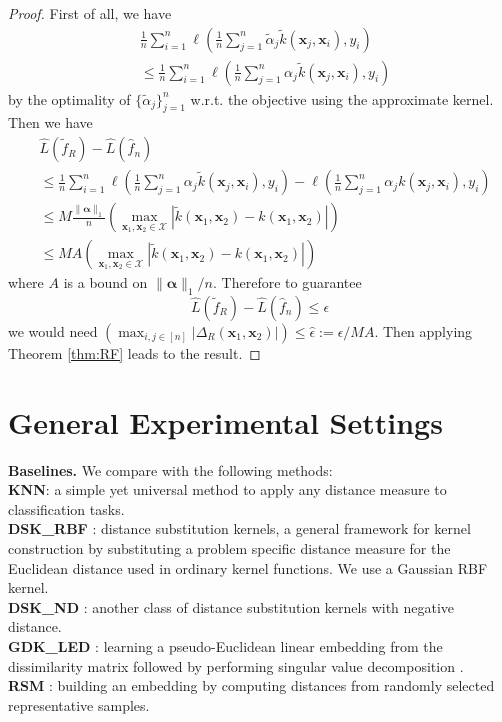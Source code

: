 \documentclass{article}
\newcommand{\X}{\mathcal{X}}
\newcommand{\1}{\mathbf{1}}
\newcommand{\bx}{\boldsymbol{x}}
\newcommand{\hf}{\hat{f}}
\newcommand{\tf}{\tilde{f}}
\newcommand{\tk}{\tilde{k}}
\newcommand{\balpha}{\boldsymbol{\alpha}}
\newcommand{\hL}{\hat{L}}
\newcommand{\talpha}{\tilde{\alpha}}
\begin{document}
\begin{proof}
First of all, we have
\begin{align*}
&\frac{1}{n}\sum_{i=1}^n \ell(\frac{1}{n}\sum_{j=1}^n \talpha_j\tk(\bx_j,\bx_i),y_i)\\
&\leq \frac{1}{n}\sum_{i=1}^n \ell(\frac{1}{n}\sum_{j=1}^n \alpha_j\tk(\bx_j,\bx_i),y_i)
\end{align*}
by the optimality of $\{\talpha_j\}_{j=1}^n$ w.r.t. the objective using the approximate kernel. Then we have
\begin{align*}
&\hL(\tf_R)-\hL(\hf_n)\\ 
&\leq \frac{1}{n}\sum_{i=1}^n \ell(\frac{1}{n}\sum_{j=1}^n\alpha_j\tk(\bx_j,\bx_i),y_i)-\ell(\frac{1}{n}\sum_{j=1}^n\alpha_j k(\bx_j,\bx_i),y_i) \\
&\leq M \frac{\|\balpha\|_1}{n}\left(\max_{\bx_1,\bx_2\in\X}|\tk(\bx_1,\bx_2)-k(\bx_1,\bx_2)|\right) \\
&\leq MA\left(\max_{\bx_1,\bx_2\in\X}|\tk(\bx_1,\bx_2)-k(\bx_1,\bx_2)|\right) 
\end{align*}
where $A$ is a bound on $\|\balpha\|_1/n$.
Therefore to guarantee 
$$
\hL(\tf_R)-\hL(\hf_n) \leq \epsilon
$$
we would need $\left(\max_{i,j\in[n]} |\Delta_R(\bx_1,\bx_2)|\right)\leq \hat{\epsilon}:=\epsilon/MA$. Then applying Theorem \ref{thm:RF} leads to the result.
\end{proof}


\section{General Experimental Settings}
\label{App:General Experimental Settings}

\textbf{Baselines.} We compare with the following methods: \\
\textbf{KNN}: a simple yet universal method to apply any distance measure to classification tasks. \\
\textbf{DSK\_RBF} \cite{haasdonk2004learning}: distance substitution kernels, a general framework for kernel construction by substituting  a problem specific distance measure for the Euclidean distance used in ordinary kernel functions. We use a Gaussian RBF kernel. \\
\textbf{DSK\_ND} \cite{haasdonk2004learning}: another class of distance substitution kernels with negative distance. \\
\textbf{GDK\_LED} \cite{pekalska2001generalized}: learning a pseudo-Euclidean linear embedding from the dissimilarity matrix followed by performing singular value decomposition \cite{wu2015preconditioned,wu2017primme_svds}. \\
\textbf{RSM} \cite{pekalska2001generalized}:  building an embedding by computing distances from randomly selected representative samples. 
\end{document}
